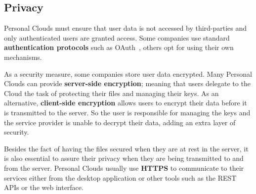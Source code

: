 \subsection{Privacy}


Personal Clouds must ensure that user data is not accessed by third-parties and only authenticated users are granted access. Some companies use standard \textbf{authentication protocols} such as OAuth~\cite{oauth}, others opt for using their own mechanisms.

As a security measure, some companies store user data encrypted. Many Personal Clouds can provide \textbf{server-side encryption}; meaning that users delegate to the Cloud the task of protecting their files and managing their keys. As an alternative, \textbf{client-side encryption} allows users to encrypt their data before it is transmitted to the server. So the user is responsible for managing the keys and the service provider is unable to decrypt their data, adding an extra layer of security.

Besides the fact of having the files secured when they are at rest in the server, it is also essential to assure their privacy when they are being transmitted to and from the server. Personal Clouds usually use \textbf{HTTPS} to communicate to their services either from the desktop application or other tools such as the REST APIs or the web interface.


